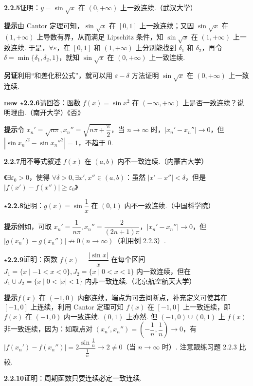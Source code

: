 \documentclass[UTF8,12pt,a4paper,fontset=fandol]{ctexart}
\begin{document}
\noindent\textbf{2.2.5}\quad 证明：$y=\sin\sqrt{x}$ 在 $(0,+\infty)$ 上一致连续.（武汉大学）

\noindent\textbf{提示}\quad 由 Cantor 定理可知，$\sin\sqrt{x}$ 在 $[0,1]$ 上一致连续；又因 $\sin\sqrt{x}$ 在 $(1,+\infty)$ 上导数有界，从而满足 Lipschitz 条件，知 $\sin\sqrt{x}$ 在 $(1,+\infty)$ 上一致连续. 于是，$\forall\varepsilon$，在 $[0,1]$ 和 $(1,+\infty)$ 上分别能找到 $\delta_1$ 和 $\delta_2$，再令 $\delta=\min\{\delta_1,\delta_2,1\}$，就知 $\sin\sqrt{x}$ 在 $(0,+\infty)$ 上一致连续.

\noindent\textbf{另证}\quad 利用“和差化积公式”，就可以用 $\varepsilon-\delta$ 方法证明 $\sin\sqrt{x}$ 在 $(0,+\infty)$ 上一致连续.

\noindent\textbf{new $\star$2.2.6}\quad 请回答：函数 $f(x)=\sin x^2$ 在 $(-\infty,+\infty)$ 上是否一致连续？说明理由.（南开大学）\hfill《否》

\noindent\textbf{提示}\quad 令 $x_n'=\sqrt{n\pi},x_n''=\sqrt{n\pi+\dfrac\pi2}$，当 $n\to\infty$ 时，$|x_n'-x_n''|\to0$，但 $|\sin x_n'^2-\sin x_n''^2|=1$，不趋于 0.

\noindent\textbf{2.2.7}\quad 用不等式叙述 $f(x)$ 在 $(a,b)$ 内不一致连续.（内蒙古大学）

《$\exists\varepsilon_0>0$，使得 $\forall\delta>0,\exists x',x''\in(a,b)$：虽然 $|x'-x''|<\delta$，但是 $|f(x')-f(x'')|\ge\varepsilon_0$》

\noindent\textbf{$\star$2.2.8}\quad 证明：$g(x)=\sin\dfrac1x$ 在 $(0,1)$ 内不一致连续.（中国科学院）

\noindent\textbf{提示}\quad 例如，可取 $x_n'=\dfrac1{n\pi},x_n''=\dfrac2{(2n+1)\pi}$，$|x_n'-x_n''|\to0$，但 $|g(x_n')-g(x_n'')|\not\to0(n\to\infty)$（利用例 2.2.3）.

\noindent\textbf{$\star$2.2.9}\quad 证明：函数 $f(x)=\dfrac{|\sin x|}{x}$ 在每个区间 $J_1=\{x\mid -1<x<0\},J_2=\{x\mid0<x<1\}$ 内一致连续，但在 $J_1\cup J_2=\{x\mid0<|x|<1\}$ 内非一致连续.（北京航空航天大学）

\noindent\textbf{提示}\quad $f(x)$ 在 $(-1,0)$ 内部连续，端点为可去间断点，补充定义可使其在 $[-1,0]$ 上连续，利用 Cantor 定理可知 $f(x)$ 在 $[-1,0]$ 上一致连续，即 $f(x)$ 在 $(-1,0)$ 内一致连续. $(0,1)$ 上亦然. 但 $(-1,0)\cup(0,1)$ 上 $f(x)$ 非一致连续，因为：如取点对 $(x_n',x_n'')=\left(-\dfrac1n,\dfrac1n\right)\to0$，有 $|f(x_n')-f(x_n'')|=2\dfrac{\sin\frac1n}{\frac1n}\to2\ne0$（当 $n\to\infty$ 时）. 注意跟练习题 2.2.3 比较.

\noindent\textbf{2.2.10}\quad 证明：周期函数只要连续必定一致连续.
\end{document}
